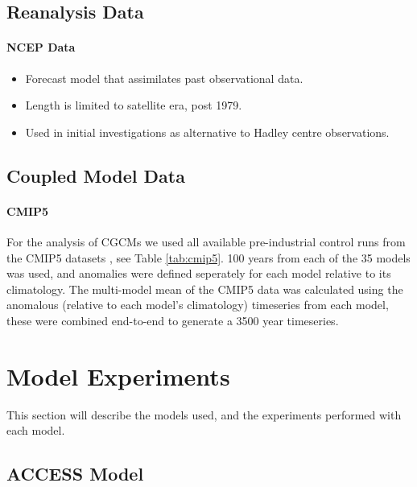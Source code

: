 \subsection{Reanalysis Data}

\paragraph{NCEP Data}
\begin{itemize}
	\item Forecast model that assimilates past observational data.
	\item Length is limited to satellite era, post 1979.
	\item Used in initial investigations as alternative to Hadley centre 
		observations.
\end{itemize}


\subsection{Coupled Model Data}

\paragraph{CMIP5}
For the analysis of CGCMs we used all available pre-industrial control runs from 
the CMIP5 datasets \citep{Taylor2012}, see Table \ref{tab:cmip5}. 100 years from 
each of the 35 models was used, and anomalies were defined seperately for each 
model relative to its climatology. The multi-model mean of the CMIP5 data was 
calculated using the anomalous (relative to each model’s climatology) timeseries 
from each model, these were combined end-to-end to generate a 3500 year 
timeseries. 




\section{Model Experiments}

This section will describe the models used, and the experiments performed with 
each model.


\subsection{ACCESS Model}

